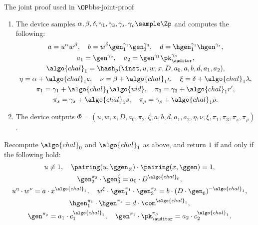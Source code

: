 \begin{protocolbox}{The joint proof used in $\OP$}{bbs-joint-proof}
\begin{description}
\begin{enumerate}
	\item The device samples $\alpha, \beta, \delta, \gamma_1, \gamma_3,
\gamma_s, \gamma_\rho \sample \Zp$ and computes the following:
          \begin{gather*}
            a = u^{\alpha} w^{\beta}, \quad b = w^{\delta} \gen_1^{\gamma_1}
\gen_3^{\gamma_3}, \quad d = \hgen_1^{\gamma_1} \hgen^{\gamma_s}, \\ a_1 =
\gen^{\gamma_\rho}, \quad a_2 = \gen^{\gamma_1} \pk_\auditor^{\gamma_\rho}, \\
            \algo{chal}_1 = \hash_p(\inst, u, w, x, D, a_0, a, b, d, a_1, a_2),
\\
            \eta = \alpha + \algo{chal}_1 e, \quad \nu = \beta + \algo{chal}_1
\iota, \quad \xi = \delta + \algo{chal}_1 \lambda, \\
            \pi_1 = \gamma_1 + \algo{chal}_1 \algo{uid}, \quad \pi_3 =
\gamma_3 + \algo{chal}_1 r', \\
            \pi_s = \gamma_s + \algo{chal}_1 s, \quad
\pi_\rho = \gamma_\rho + \algo{chal}_1 \rho.
          \end{gather*}

	\item The device outputs $\Phi = (u,\allowbreak w,\allowbreak x,\allowbreak D,\allowbreak a_0,\allowbreak \pi_2,\allowbreak \zeta,\allowbreak a,\allowbreak b,
d,\allowbreak a_1,\allowbreak a_2,\allowbreak \eta,\allowbreak \nu,\allowbreak \xi,\allowbreak \pi_1,\allowbreak \pi_3,\allowbreak \pi_s,\allowbreak \pi_\rho)$.

      \end{enumerate}

    \item[$\{0,1\} \leftarrow \JPOKverify(\inst, \Phi)$ :] Recompute
$\algo{chal}_0$ and $\algo{chal}_1$ as above, and return $1$ if and only if the
following hold:
      \begin{gather*}
        u \neq 1, \quad \pairing(u, \ggen_Z) \cdot \pairing(x, \ggen) = 1, \\
\gen_2^{\pi_2} \cdot \gen_3^{\zeta} = a_0 \cdot D^{\algo{chal}_0}, \\
        u^{\eta} \cdot w^{\nu} = a \cdot x^{\algo{chal}_1}, \quad w^{\xi} \cdot
\gen_1^{\pi_1} \cdot \gen_3^{\pi_3} = b \cdot (D \cdot
\gen_0)^{-\algo{chal}_1}, \\ \hgen_1^{\pi_1} \cdot \hgen^{\pi_s} = d \cdot
\com^{\algo{chal}_1}, \\
        \gen^{\pi_\rho} = a_1 \cdot c_1^{\algo{chal}_1}, \quad \gen^{\pi_1}
\cdot \pk_\auditor^{\pi_\rho} = a_2 \cdot c_2^{\algo{chal}_1}.
      \end{gather*}

  \end{description}

\end{protocolbox}

